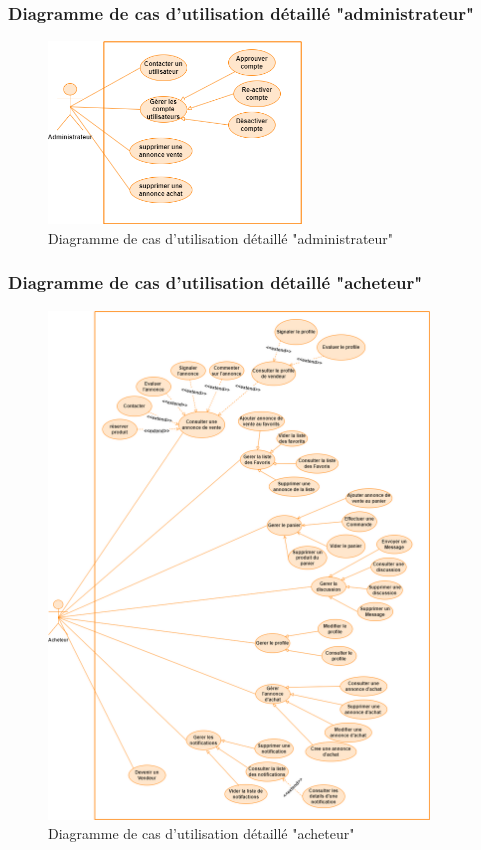 \documentclass[edit,12pt,a4paper,ChapStyle,oneside,doubleinterligne]{report}
\begin{document}
\subsubsection{Diagramme de cas d'utilisation détaillé "administrateur" }
\begin{figure}[h!]\label{fig:Diagramme de cas d'utilisation détaillé "administrateur"n}
\centering
\includegraphics[width=0.6\textwidth]{images/diagramme de cas a1.png}
\caption{Diagramme de cas d'utilisation détaillé "administrateur"}
\end{figure}
\newpage
\subsubsection{Diagramme de cas d'utilisation détaillé "acheteur" }
\begin{figure}[h!]\label{fig:Diagramme de cas d'utilisation détaillé "acheteur"}
\centering
\includegraphics[width=0.9\textwidth]{images/diagramme de cas ach.png}
\caption{Diagramme de cas d'utilisation détaillé "acheteur"}
\end{figure}
\newpage
\end{document}
